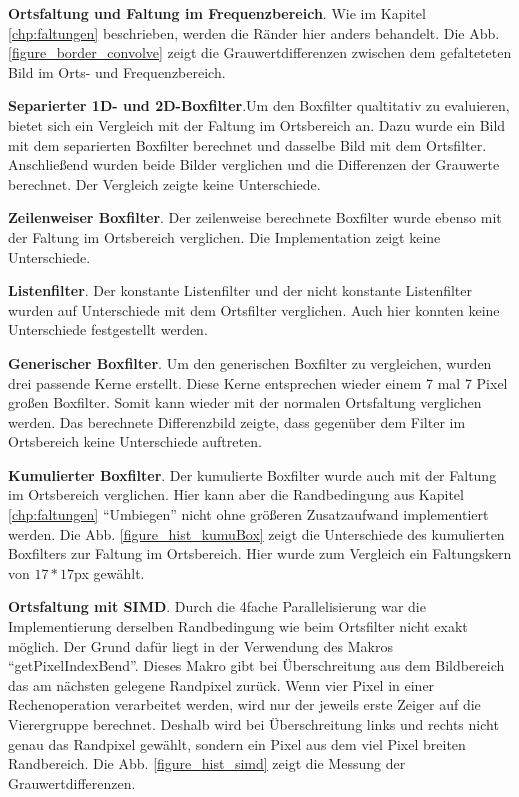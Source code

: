 \documentclass[a4paper,12pt]{article}
\begin{document}

\textbf{Ortsfaltung und Faltung im Frequenzbereich}. Wie im
Kapitel \ref{chp:faltungen} beschrieben, werden die Ränder hier anders
behandelt. Die Abb. \ref{figure_border_convolve} zeigt die Grauwertdifferenzen
zwischen dem gefalteteten Bild im Orts- und Frequenzbereich. 

\textbf{Separierter 1D- und 2D-Boxfilter}.Um den Boxfilter qualtitativ
zu evaluieren, bietet sich ein Vergleich mit der Faltung im Ortsbereich an.
Dazu wurde ein Bild mit dem separierten Boxfilter berechnet und dasselbe Bild
mit dem Ortsfilter. Anschließend wurden beide Bilder verglichen und die
Differenzen der Grauwerte berechnet. Der Vergleich zeigte keine Unterschiede.


\textbf{Zeilenweiser Boxfilter}. Der zeilenweise berechnete Boxfilter wurde
ebenso mit der Faltung im Ortsbereich verglichen. Die
Implementation zeigt keine Unterschiede.

\textbf{Listenfilter}. Der konstante Listenfilter und der nicht konstante
Listenfilter wurden auf Unterschiede mit dem Ortsfilter verglichen.
Auch hier konnten keine Unterschiede festgestellt werden.

\textbf{Generischer Boxfilter}. Um den generischen Boxfilter zu vergleichen,
wurden drei passende Kerne erstellt. Diese Kerne entsprechen wieder einem 7 mal
7 Pixel großen Boxfilter. Somit kann wieder mit der normalen Ortsfaltung
verglichen werden. Das berechnete Differenzbild zeigte, dass
gegenüber dem Filter im Ortsbereich keine Unterschiede auftreten.

\textbf{Kumulierter Boxfilter}. Der kumulierte Boxfilter wurde auch mit der
Faltung im Ortsbereich verglichen. Hier kann aber die Randbedingung aus
Kapitel \ref{chp:faltungen} "`Umbiegen"' nicht ohne größeren
Zusatzaufwand implementiert werden. Die Abb.
\ref{figure_hist_kumuBox} zeigt die Unterschiede des kumulierten Boxfilters zur
Faltung im Ortsbereich. Hier wurde zum Vergleich ein Faltungskern von $17*17$px
gewählt.


\textbf{Ortsfaltung mit SIMD}. Durch die 4fache
Parallelisierung war die Implementierung derselben Randbedingung wie beim
Ortsfilter nicht exakt möglich. Der Grund dafür liegt in der Verwendung
des Makros "`getPixelIndexBend"'.
Dieses Makro gibt bei Überschreitung aus dem Bildbereich das am nächsten
gelegene Randpixel zurück. Wenn vier Pixel in einer Rechenoperation verarbeitet
werden, wird nur der jeweils erste Zeiger auf die Vierergruppe berechnet.
Deshalb wird bei Überschreitung links und rechts nicht genau das Randpixel
gewählt, sondern ein Pixel aus dem viel Pixel breiten Randbereich. Die
Abb. \ref{figure_hist_simd} zeigt die Messung der Grauwertdifferenzen. 
\end{document}
